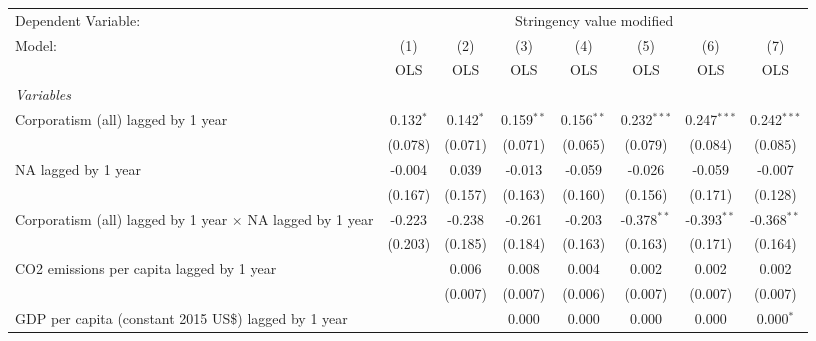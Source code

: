 
\begingroup
\centering
\begin{tabular}{lccccccc}
   \toprule
   Dependent Variable: & \multicolumn{7}{c}{Stringency value modified}\\
   Model:                                                           & (1)         & (2)         & (3)          & (4)            & (5)            & (6)            & (7)\\  
                                                                    &  OLS        & OLS         & OLS          & OLS            & OLS            & OLS            & OLS\\  
   \midrule
   \emph{Variables}\\
   Corporatism (all) lagged by 1 year                               & 0.132$^{*}$ & 0.142$^{*}$ & 0.159$^{**}$ & 0.156$^{**}$   & 0.232$^{***}$  & 0.247$^{***}$  & 0.242$^{***}$\\   
                                                                    & (0.078)     & (0.071)     & (0.071)      & (0.065)        & (0.079)        & (0.084)        & (0.085)\\   
   NA lagged by 1 year                                              & -0.004      & 0.039       & -0.013       & -0.059         & -0.026         & -0.059         & -0.007\\   
                                                                    & (0.167)     & (0.157)     & (0.163)      & (0.160)        & (0.156)        & (0.171)        & (0.128)\\   
   Corporatism (all) lagged by 1 year $\times$ NA lagged by 1 year  & -0.223      & -0.238      & -0.261       & -0.203         & -0.378$^{**}$  & -0.393$^{**}$  & -0.368$^{**}$\\   
                                                                    & (0.203)     & (0.185)     & (0.184)      & (0.163)        & (0.163)        & (0.171)        & (0.164)\\   
   CO2 emissions per capita lagged by 1 year                        &             & 0.006       & 0.008        & 0.004          & 0.002          & 0.002          & 0.002\\   
                                                                    &             & (0.007)     & (0.007)      & (0.006)        & (0.007)        & (0.007)        & (0.007)\\   
   GDP per capita (constant 2015 US\$) lagged by 1 year             &             &             & 0.000        & 0.000          & 0.000          & 0.000          & 0.000$^{*}$\\   

\end{tabular}
